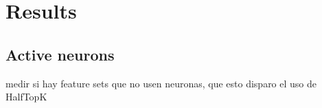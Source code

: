 
\section{Results}


\subsection{Active neurons}

medir si hay feature sets que no usen neuronas, que esto disparo el uso de HalfTopK
